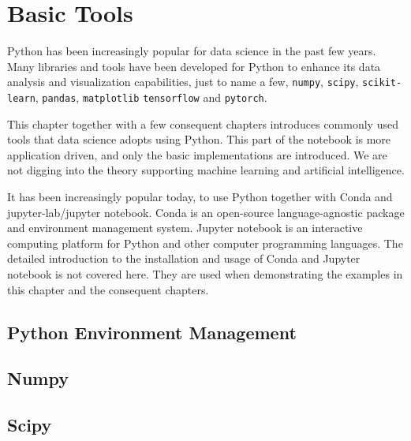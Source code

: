 \chapter{Basic Tools} \label{ch:numpyscipy}

Python has been increasingly popular for data science in the past few years. Many libraries and tools have been developed for Python to enhance its data analysis and visualization capabilities, just to name a few, \verb|numpy|, \verb|scipy|, \verb|scikit-learn|, \verb|pandas|, \verb|matplotlib| \verb|tensorflow| and \verb|pytorch|.

This chapter together with a few consequent chapters introduces commonly used tools that data science adopts using Python. This part of the notebook is more application driven, and only the basic implementations are introduced. We are not digging into the theory supporting machine learning and artificial intelligence.

It has been increasingly popular today, to use Python together with Conda and jupyter-lab/jupyter notebook. Conda is an open-source language-agnostic package and environment management system. Jupyter notebook is an interactive computing platform for Python and other computer programming languages. The detailed introduction to the installation and usage of Conda and Jupyter notebook is not covered here. They are used when demonstrating the examples in this chapter and the consequent chapters.

\section{Python Environment Management}


\section{Numpy}


\section{Scipy} 